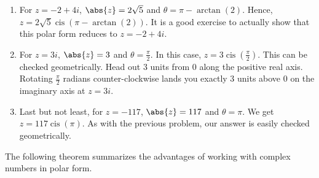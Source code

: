 {\begin{enumerate}
\begin{enumerate}
\item  For $z = -2+4i$, $\abs{z} = 2\sqrt{5}$ and $\theta = \pi - \arctan(2)$.  Hence, $z = 2\sqrt{5} \operatorname{cis}(\pi - \arctan(2))$.  It is a good exercise to actually show that this polar form reduces to $z=-2+4i$.

\item  For $z = 3i$, $\abs{z} = 3$ and $\theta = \frac{\pi}{2}$.  In this case, $z = 3 \operatorname{cis}\left(\frac{\pi}{2}\right)$.  This can be checked geometrically.  Head out $3$ units from $0$ along the positive real axis. Rotating $\frac{\pi}{2}$ radians counter-clockwise lands you exactly $3$ units above $0$ on the imaginary axis at $z = 3i$.

\item  Last but not least, for $z = -117$, $\abs{z} = 117$ and $\theta = \pi$. We get $z = 117 \operatorname{cis}(\pi)$. As with the previous problem, our answer is easily checked geometrically. 

\end{enumerate}

\end{enumerate}
}

\medskip

The following theorem summarizes the advantages of working with complex numbers in polar form.

\medskip


